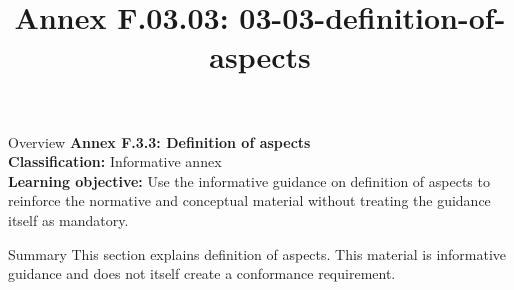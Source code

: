 \documentclass[10pt,letterpaper]{article}
\title{Annex F.03.03: 03-03-definition-of-aspects}
\author{}
\date{}
\begin{document}
\maketitle
\begin{CornellOverviewBox}{Overview}
{\Large\bfseries\textcolor{CNavy}{Annex F.3.3: Definition of aspects}}\\[3pt]
{\small\textbf{Classification:} Informative annex}\\
{\small\textbf{Learning objective:} Use the informative guidance on definition of aspects to reinforce the normative and conceptual material without treating the guidance itself as mandatory.}
\end{CornellOverviewBox}
\vspace{3pt}

\begin{CornellNotesTable}
\end{CornellNotesTable}


\begin{CornellSummaryBox}{Summary}
This section explains definition of aspects. This material is informative guidance and does not itself create a conformance requirement.
\end{CornellSummaryBox}
\end{document}
